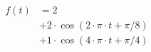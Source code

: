\begin{center}
\begin{align*}
f(t) &= 2 \\
&+ 2 \cdot \cos( 2 \cdot \pi \cdot t + \pi/8 ) \\
&+ 1 \cdot \cos( 4 \cdot \pi \cdot t + \pi/4 )
\end{align*}
\end{center}
